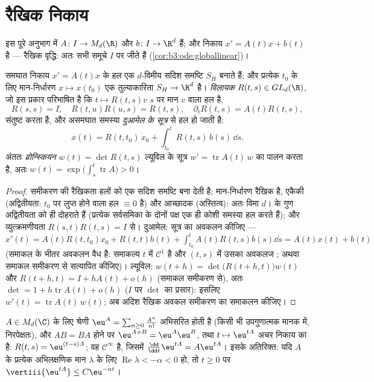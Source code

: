 \section{रैखिक निकाय}

इस पूरे अनुभाग में $A \colon I \to M_d(\R)$ और $b
\colon I \to \R^d$  हैं; और निकाय $x' = A(t)x
+ b(t)$ है ---
रैखिक वृद्धि: अतः सभी  समूचे $I$ पर जीते हैं (\cref{cor:b3:ode:globallinear})।

\begin{theorem}[संरचना]\label{thm:b3:ode:linearstructure}
समघात निकाय $x' = A(t)x$ के हल एक $d$-विमीय सदिश समष्टि $S_H$ बनाते
हैं; और प्रत्येक $t_0$ के लिए मान-निर्धारण $x \mapsto x(t_0)$ एक तुल्याकारिता
$S_H \to
\R^d$ है। \emph{विलायक} $R(t, s) \in GL_d(\R)$, जो
इस प्रकार परिभाषित है कि $t \mapsto R(t,
s)v$ $s$ पर मान $v$ वाला हल है,
\[
R(s,s) = I,\quad R(t, u)R(u, s) = R(t, s),\quad
\partial_tR(t,s) = A(t)R(t,s),
\]
संतुष्ट करता है, और असमघात समस्या \emph{दुआमेल के
सूत्र} से हल हो जाती है:
\[
x(t) = R(t, t_0)\,x_0 + \int_{t_0}^{t}R(t, s)\,b(s)\,\dd s .
\]
अंततः \emph{व्रोन्स्कियन} $w(t) = \det
R(t, s)$ ल्यूविल के
सूत्र $w' =
\operatorname{tr}A(t)\,w$ का पालन करता है, अतः $w(t) =
\exp\bigl(\int_s^t\operatorname{tr}A\bigr) > 0$।
\end{theorem}

\begin{proof}
समीकरण की रैखिकता हलों को एक सदिश समष्टि बना देती है;
मान-निर्धारण रैखिक है, एकैकी (अद्वितीयता: $t_0$ पर लुप्त होने
वाला हल $\equiv 0$ है) और आच्छादक (अस्तित्व): अतः विमा $d$। 
के गुण अद्वितीयता को ही दोहराते हैं (प्रत्येक सर्वसमिका के दोनों
पक्ष एक ही कोशी समस्या हल करते हैं); और व्युत्क्रमणीयता $R(s,t)R(t,s) = I$ से।
दुआमेल: सूत्र का अवकलन कीजिए --- $x'(t) = A(t)R(t,t_0)x_0 + R(t,t)b(t) +
\int_{t_0}^tA(t)R(t,s)b(s)\dd s = A(t)x(t) + b(t)$ (समाकल के भीतर अवकलन वैध
है: समाकल्य $t$ में $\mathcal C^1$ है और $(t,s)$ में उसका अवकलज ; अथवा
समाकल समीकरण से सत्यापित कीजिए)। ल्यूविल: $w(t + h) = \det\bigl(R(t+h, t)\bigr)w(t)$ और $R(t + h, t) =
I + hA(t) + o(h)$ (समाकल
समीकरण से), अतः $\det = 1
+ h\operatorname{tr}A(t) + o(h)$ ($I$ पर $\det$ का प्रसार): इसलिए $w'(t) = \operatorname{tr}A(t)\,w(t)$; अब
अदिश रैखिक अवकल समीकरण का समाकलन कीजिए।
\end{proof}

\begin{theorem}[आव्यूह चरघातांकी]\label{thm:b3:ode:matrixexp}
$A \in M_d(\C)$ के लिए श्रेणी $\eu^{A} =
\sum_{n\geq0}\frac{A^n}{n!}$ अभिसरित होती है (किसी भी उपगुणात्मक
मानक में, निरपेक्षतः), और $AB = BA$ होने पर $\eu^{A+B} = \eu^A\eu^B$, तथा $t \mapsto \eu^{tA}$ अचर
निकाय का  है: $R(t,s) = \eu^{(t-s)A}$; वह $\mathcal
C^\infty$ है, जिसमें $\frac{\dd}{\dd t}\eu^{tA} = A\eu^{tA}$। इसके
अतिरिक्त: यदि $A$ के प्रत्येक अभिलक्षणिक मान $\lambda$ के लिए $\operatorname{Re}\lambda < -\alpha < 0$
हो, तो $t \geq 0$ पर $\vertiii{\eu^{tA}}
\leq C\eu^{-\alpha t}$।
\end{theorem}

